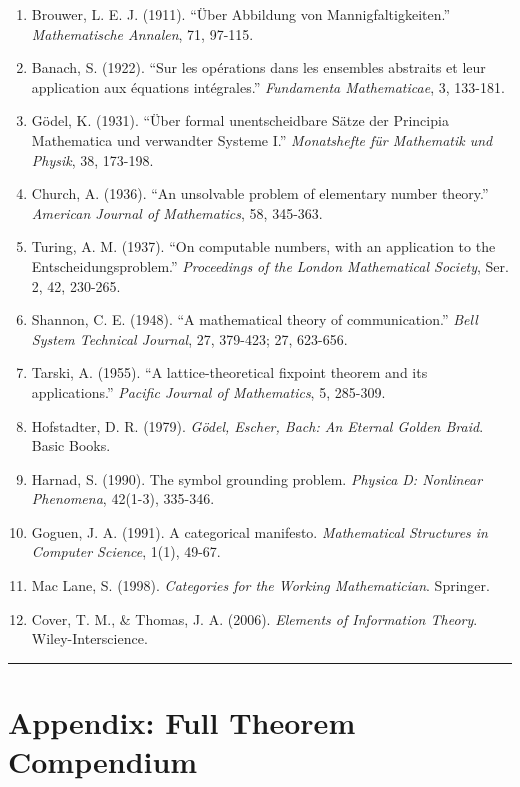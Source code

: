 \documentclass[
]{article}
\providecommand{\tightlist}{%
  \setlength{\itemsep}{0pt}\setlength{\parskip}{0pt}}
\begin{document}
\begin{enumerate}
\def\labelenumi{\arabic{enumi}.}
\tightlist
\item
  Brouwer, L. E. J. (1911). ``Über Abbildung von Mannigfaltigkeiten.''
  \emph{Mathematische Annalen}, 71, 97-115.
\item
  Banach, S. (1922). ``Sur les opérations dans les ensembles abstraits
  et leur application aux équations intégrales.'' \emph{Fundamenta
  Mathematicae}, 3, 133-181.
\item
  Gödel, K. (1931). ``Über formal unentscheidbare Sätze der Principia
  Mathematica und verwandter Systeme I.'' \emph{Monatshefte für
  Mathematik und Physik}, 38, 173-198.
\item
  Church, A. (1936). ``An unsolvable problem of elementary number
  theory.'' \emph{American Journal of Mathematics}, 58, 345-363.
\item
  Turing, A. M. (1937). ``On computable numbers, with an application to
  the Entscheidungsproblem.'' \emph{Proceedings of the London
  Mathematical Society}, Ser. 2, 42, 230-265.
\item
  Shannon, C. E. (1948). ``A mathematical theory of communication.''
  \emph{Bell System Technical Journal}, 27, 379-423; 27, 623-656.
\item
  Tarski, A. (1955). ``A lattice-theoretical fixpoint theorem and its
  applications.'' \emph{Pacific Journal of Mathematics}, 5, 285-309.
\item
  Hofstadter, D. R. (1979). \emph{Gödel, Escher, Bach: An Eternal Golden
  Braid}. Basic Books.
\item
  Harnad, S. (1990). The symbol grounding problem. \emph{Physica D:
  Nonlinear Phenomena}, 42(1-3), 335-346.
\item
  Goguen, J. A. (1991). A categorical manifesto. \emph{Mathematical
  Structures in Computer Science}, 1(1), 49-67.
\item
  Mac Lane, S. (1998). \emph{Categories for the Working Mathematician}.
  Springer.
\item
  Cover, T. M., \& Thomas, J. A. (2006). \emph{Elements of Information
  Theory}. Wiley-Interscience.
\end{enumerate}

\begin{center}\rule{0.5\linewidth}{0.5pt}\end{center}

\section{Appendix: Full Theorem
Compendium}\label{appendix-full-theorem-compendium}
\end{document}
